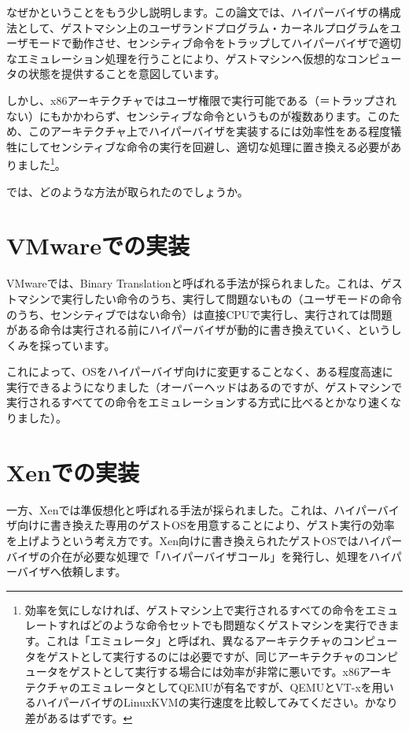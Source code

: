 \documentclass[a4j,12pt]{jarticle}
\begin{document}
なぜかということをもう少し説明します。この論文では、ハイパーバイザの構成法として、ゲストマシン上のユーザランドプログラム・カーネルプログラムをユーザモードで動作させ、センシティブ命令をトラップしてハイパーバイザで適切なエミュレーション処理を行うことにより、ゲストマシンへ仮想的なコンピュータの状態を提供することを意図しています。

しかし、x86アーキテクチャではユーザ権限で実行可能である（＝トラップされない）にもかかわらず、センシティブな命令というものが複数あります。このため、このアーキテクチャ上でハイパーバイザを実装するには効率性をある程度犠牲にしてセンシティブな命令の実行を回避し、適切な処理に置き換える必要がありました\footnote{効率を気にしなければ、ゲストマシン上で実行されるすべての命令をエミュレートすればどのような命令セットでも問題なくゲストマシンを実行できます。これは「エミュレータ」と呼ばれ、異なるアーキテクチャのコンピュータをゲストとして実行するのには必要ですが、同じアーキテクチャのコンピュータをゲストとして実行する場合には効率が非常に悪いです。x86アーキテクチャのエミュレータとしてQEMUが有名ですが、QEMUとVT-xを用いるハイパーバイザのLinuxKVMの実行速度を比較してみてください。かなり差があるはずです。}。

では、どのような方法が取られたのでしょうか。

\section{VMwareでの実装}
VMwareでは、Binary Translationと呼ばれる手法が採られました。これは、ゲストマシンで実行したい命令のうち、実行して問題ないもの（ユーザモードの命令のうち、センシティブではない命令）は直接CPUで実行し、実行されては問題がある命令は実行される前にハイパーバイザが動的に書き換えていく、というしくみを採っています。

これによって、OSをハイパーバイザ向けに変更することなく、ある程度高速に実行できるようになりました（オーバーヘッドはあるのですが、ゲストマシンで実行されるすべてての命令をエミュレーションする方式に比べるとかなり速くなりました）。

\section{Xenでの実装}
一方、Xenでは準仮想化と呼ばれる手法が採られました。これは、ハイパーバイザ向けに書き換えた専用のゲストOSを用意することにより、ゲスト実行の効率を上げようという考え方です。Xen向けに書き換えられたゲストOSではハイパーバイザの介在が必要な処理で「ハイパーバイザコール」を発行し、処理をハイパーバイザへ依頼します。
\end{document}
